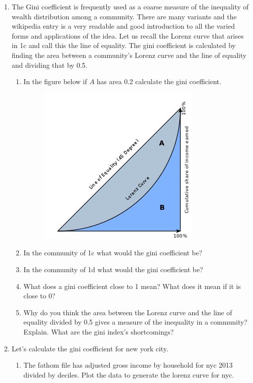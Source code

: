\documentclass[12pt]{article}
\theoremstyle{plain}     %
\begin{document}
\begin{enumerate}
\begin{enumerate}
		\end{enumerate}
		\item The Gini coefficient is frequently used as a coarse measure of the inequality of wealth distribution among a community. There are many variants and the wikipedia entry is a very readable and good introduction to all the varied forms and applications of the idea. Let us recall the Lorenz curve that arises in 1c and call this the line of equality. The gini coefficient is calculated by finding the area between a community's Lorenz curve and the line of equality and dividing that by 0.5.
			\begin{enumerate}
				\item In the figure below if $A$ has area 0.2 calculate the gini coefficient.
					\begin{figure}[H]
						\hspace{2cm}\includegraphics[scale=.4]{1.png}
					\end{figure}
					\item In the community of 1c what would the gini coefficient be?
					\item In the community of 1d what would the gini coefficient be?
					\item What does a gini coefficient close to 1 mean? What does it mean if it is close to 0?
					\item Why do you think the area between the Lorenz curve and the line of equality divided by 0.5 gives a measure of the inequality in a community? Explain. What are the gini index's shortcomings?
			\end{enumerate}
		\item Let's calculate the gini coefficient for new york city.
			\begin{enumerate}
			\item The fathom file has adjusted gross income by household for nyc 2013 divided by deciles. Plot the data to generate the lorenz curve for nyc.

\end{enumerate}
\end{enumerate}
\end{document}
